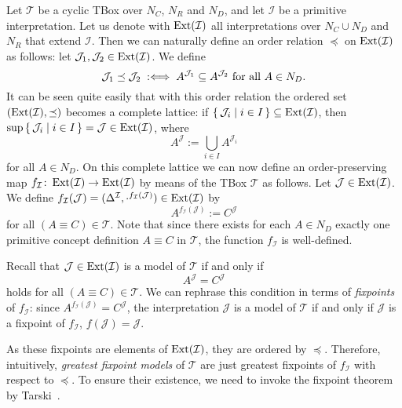 Let $\mathcal{T}$ be a cyclic TBox over $N_C$, $N_R$ and $N_D$, and let $\mathcal{I}$ be a
primitive interpretation.  Let us denote with $\operatorname{Ext}(\mathcal{I})$ all interpretations over
$N_C \cup N_D$ and $N_R$ that extend $\mathcal{I}$.  Then we can naturally define an order
relation $\preceq$ on $\operatorname{Ext}(\mathcal{I})$ as follows: let $\mathcal{J}_1, \mathcal{J}_2
\in \operatorname{Ext}(\mathcal{I})$.  We define
\begin{equation*}
  \mathcal{J}_1 \preceq \mathcal{J}_2 \;:\Longleftrightarrow\; A^{\mathcal{J}_1} \subseteq A^{\mathcal{J}_2}
  \text{ for all } A \in N_D.
\end{equation*}
It can be seen quite easily that with this order relation the ordered set
$(\operatorname{Ext}(\mathcal{I}), \preceq)$ becomes a complete lattice: if ${\{\, \mathcal{J}_i \mid i
  \in I \,\}} \subseteq \operatorname{Ext}(\mathcal{I})$, then $\sup {\ensuremath{\{\, \mathcal{J}_i \mid i \in I \,\}}} =
\mathcal{J} \in \operatorname{Ext}(\mathcal{I})$, where
\begin{equation*}
  A^{\mathcal{J}} := \bigcup_{i \in I} A^{\mathcal{J}_i}
\end{equation*}
for all $A \in N_D$.  On this complete lattice we can now define an order-preserving map
$f_{\mathcal{I}} \colon \operatorname{Ext}(\mathcal{I}) \to \operatorname{Ext}(\mathcal{I})$ by means of the TBox
$\mathcal{T}$ as follows.  Let $\mathcal{J} \in \operatorname{Ext}(\mathcal{I})$.  We define
$f_{\mathcal{I}}(\mathcal{J}) = (\Delta^{\mathcal{I}},
\cdot^{f_{\mathcal{I}}(\mathcal{J})}) \in \operatorname{Ext}(\mathcal{I})$ by
\begin{equation*}
  A^{f_{\mathcal{I}}(\mathcal{J})} := C^{\mathcal{J}}
\end{equation*}
for all $(A \equiv C) \in \mathcal{T}$.  Note that since there exists for each $A \in N_D$
exactly one primitive concept definition $A \equiv C$ in $\mathcal{T}$, the function
$f_{\mathcal{I}}$ is well-defined.

Recall that $\mathcal{J} \in \operatorname{Ext}(\mathcal{I})$ is a model of $\mathcal{T}$ if and only if
\begin{equation*}
  A^{\mathcal{J}} = C^{\mathcal{J}}
\end{equation*}
holds for all $(A \equiv C) \in \mathcal{T}$.  We can rephrase this condition in terms of
\emph{fixpoints} of $f_{\mathcal{I}}$: since $A^{f_{\mathcal{I}}(\mathcal{J})} =
C^{\mathcal{J}}$, the interpretation $\mathcal{J}$ is a model of $\mathcal{T}$ if and only
if $\mathcal{J}$ is a fixpoint of $f_{\mathcal{I}}$, \ie $f(\mathcal{J}) = \mathcal{J}$.

As these fixpoints are elements of $\operatorname{Ext}(\mathcal{I})$, they are ordered by $\preceq$.
Therefore, intuitively, \emph{greatest fixpoint models} of $\mathcal{T}$ are just greatest
fixpoints of $f_{\mathcal{I}}$ with respect to $\preceq$.  To ensure their existence, we
need to invoke the fixpoint theorem by Tarski~\cite{Tarski-Fixpoint-Theorem}.

